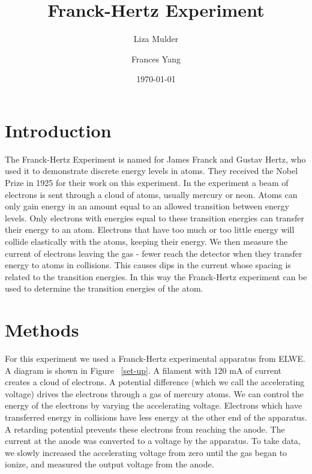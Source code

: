 \documentclass[prb,preprint]{revtex4-1}
\begin{document}

\title{Franck-Hertz Experiment}


\author{Liza Mulder}


\author{Frances Yang}


\date{\today}



\begin{abstract}

\end{abstract}

\maketitle

\section{Introduction} 

The Franck-Hertz Experiment is named for James Franck and Gustav Hertz, who used it to demonstrate discrete energy levels in atoms. 
They received the Nobel Prize in 1925 for their work on this experiment. 
In the experiment a beam of electrons is sent through a cloud of atoms, usually mercury or neon. 
Atoms can only gain energy in an amount equal to an allowed transition between energy levels. 
Only electrons with energies equal to these transition energies can transfer their energy to an atom. 
Electrons that have too much or too little energy will collide elastically with the atoms, keeping their energy. 
We then measure the current of electrons leaving the gas - fewer reach the detector when they transfer energy to atoms in collisions. 
This causes dips in the current whose spacing is related to the transition energies. 
In this way the Franck-Hertz experiment can be used to determine the transition energies of the atom. 

\section{Methods}

For this experiment we used a Franck-Hertz experimental apparatus from ELWE. A diagram is shown in Figure ~\ref{set-up}. 
A filament with 120 mA of current creates a cloud of electrons. 
A potential difference (which we call the accelerating voltage) drives the electrons through a gas of mercury atoms. 
We can control the energy of the electrons by varying the accelerating voltage. 
Electrons which have transferred energy in collisions have less energy at the other end of the apparatus. 
A retarding potential prevents these electrons from reaching the anode. 
The current at the anode was converted to a voltage by the apparatus. 
To take data, we slowly increased the accelerating voltage from zero until the gas began to ionize, and measured the output voltage from the anode. 
\end{document}

